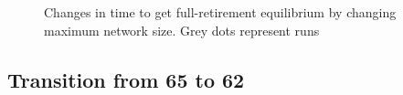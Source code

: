 \documentclass[runningheads,a4paper]{article}
\begin{document}
\begin{figure}
\centering

\caption{Changes in time to get full-retirement equilibrium by changing maximum network size. Grey dots represent runs}
\label{figure8}
\end{figure}

\subsection{Transition from 65 to 62}
\end{document}
